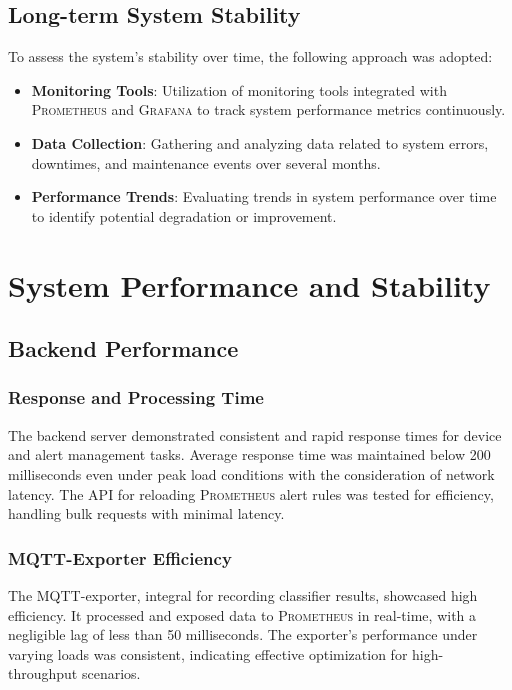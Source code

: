 \subsection{Long-term System Stability}
To assess the system's stability over time, the following approach was adopted:

\begin{itemize}
  \item \textbf{Monitoring Tools}: Utilization of monitoring tools integrated with \textsc{Prometheus} and \textsc{Grafana} to track system performance metrics continuously.
  \item \textbf{Data Collection}: Gathering and analyzing data related to system errors, downtimes, and maintenance events over several months.
  \item \textbf{Performance Trends}: Evaluating trends in system performance over time to identify potential degradation or improvement.
\end{itemize}

\section{System Performance and Stability}
\subsection{Backend Performance}
\subsubsection{Response and Processing Time}

The backend server demonstrated consistent and rapid response times for device and alert management tasks. Average response time was maintained below 200 milliseconds even under peak load conditions with the consideration of network latency. The API for reloading \textsc{Prometheus} alert rules was tested for efficiency, handling bulk requests with minimal latency.
\subsubsection{MQTT-Exporter Efficiency}

The MQTT-exporter, integral for recording classifier results, showcased high efficiency. It processed and exposed data to \textsc{Prometheus} in real-time, with a negligible lag of less than 50 milliseconds. The exporter's performance under varying loads was consistent, indicating effective optimization for high-throughput scenarios.

